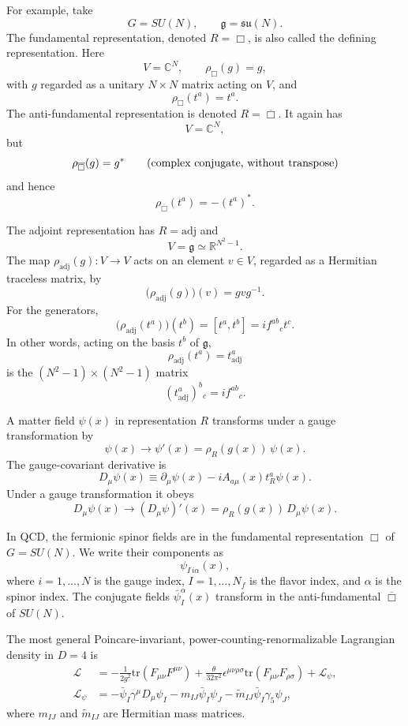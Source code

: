 For example, take
\[
  G=SU(N),\qquad \mathfrak g=\mathfrak{su}(N).
\]
The fundamental representation, denoted \(R=\Box\), is also called the
defining representation.  Here
\[
  V=\mathbb C^N,\qquad
  \rho_{\Box}(g)=g,
\]
with \(g\) regarded as a unitary \(N\times N\) matrix acting on \(V\), and
\[
  \rho_{\Box}(t^a)=t^a.
\]
The anti-fundamental representation is denoted \(R=\overline\Box\).  It
again has
\[
  V=\mathbb C^N,
\]
but
\[
  \rho_{\overline\Box}(g)=g^*
  \qquad
  \hbox{(complex conjugate, without transpose)}
\]
and hence
\[
  \rho_{\overline\Box}(t^a)=-(t^a)^*.
\]

The adjoint representation has \(R=\mathrm{adj}\) and
\[
  V=\mathfrak g\simeq \mathbb R^{N^2-1}.
\]
The map \(\rho_{\mathrm{adj}}(g):V\to V\) acts on an element
\(v\in V\), regarded as a Hermitian traceless matrix, by
\[
  \bigl(\rho_{\mathrm{adj}}(g)\bigr)(v)=gvg^{-1}.
\]
For the generators,
\[
  \bigl(\rho_{\mathrm{adj}}(t^a)\bigr)(t^b)
  =
  [t^a,t^b]
  =
  i f^{ab}{}_{c}t^c.
\]
In other words, acting on the basis \(t^b\) of \(\mathfrak g\),
\[
  \rho_{\mathrm{adj}}(t^a)=t_{\mathrm{adj}}^a
\]
is the \((N^2-1)\times (N^2-1)\) matrix
\[
  (t_{\mathrm{adj}}^a)^{b}{}_{c}=i f^{ab}{}_{c}.
\]

A matter field \(\psi(x)\) in representation \(R\) transforms under a gauge
transformation by
\[
  \psi(x)\longrightarrow
  \psi'(x)=\rho_R(g(x))\,\psi(x).
\]
The gauge-covariant derivative is
\[
  D_\mu\psi(x)
  \equiv
  \partial_\mu\psi(x)-i A_{a\mu}(x)t_R^a\psi(x).
\]
Under a gauge transformation it obeys
\[
  D_\mu\psi(x)\longrightarrow
  (D_\mu\psi)'(x)
  =
  \rho_R(g(x))\,D_\mu\psi(x).
\]

In QCD, the fermionic spinor fields are in the fundamental representation
\(\Box\) of \(G=SU(N)\).  We write their components as
\[
  \psi_{I\,i\alpha}(x),
\]
where \(i=1,\ldots,N\) is the gauge index, \(I=1,\ldots,N_f\) is the
flavor index, and \(\alpha\) is the spinor index.  The conjugate fields
\(\bar\psi_I^{\alpha}(x)\) transform in the anti-fundamental
\(\overline\Box\) of \(SU(N)\).

The most general Poincare-invariant, power-counting-renormalizable
Lagrangian density in \(D=4\) is
\[
\begin{aligned}
  \mathcal L
  &=
  -\frac{1}{2g^2}\mathrm{tr}(F_{\mu\nu}F^{\mu\nu})
  +\frac{\theta}{32\pi^2}
  \epsilon^{\mu\nu\rho\sigma}
  \mathrm{tr}(F_{\mu\nu}F_{\rho\sigma})
  +\mathcal L_\psi,
  \\
  \mathcal L_\psi
  &=
  -\bar\psi_I\gamma^\mu D_\mu\psi_I
  -m_{IJ}\bar\psi_I\psi_J
  -\widetilde m_{IJ}\bar\psi_I\gamma_5\psi_J,
\end{aligned}
\]
where \(m_{IJ}\) and \(\widetilde m_{IJ}\) are Hermitian mass matrices.

